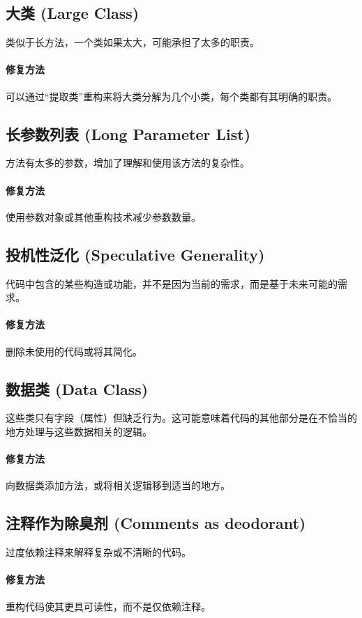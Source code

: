 \subsection{大类 (Large Class)}类似于长方法，一个类如果太大，可能承担了太多的职责。
\paragraph{修复方法}可以通过“提取类”重构来将大类分解为几个小类，每个类都有其明确的职责。

\subsection{长参数列表 (Long Parameter List)}方法有太多的参数，增加了理解和使用该方法的复杂性。
\paragraph{修复方法}使用参数对象或其他重构技术减少参数数量。

\subsection{投机性泛化 (Speculative Generality)}代码中包含的某些构造或功能，并不是因为当前的需求，而是基于未来可能的需求。
\paragraph{修复方法}删除未使用的代码或将其简化。

\subsection{数据类 (Data Class)}这些类只有字段（属性）但缺乏行为。这可能意味着代码的其他部分是在不恰当的地方处理与这些数据相关的逻辑。
\paragraph{修复方法}向数据类添加方法，或将相关逻辑移到适当的地方。

\subsection{注释作为除臭剂 (Comments as deodorant)}过度依赖注释来解释复杂或不清晰的代码。
\paragraph{修复方法}重构代码使其更具可读性，而不是仅依赖注释。

